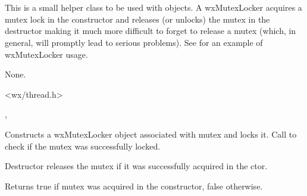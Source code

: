 \section{}\label{wxmutexlocker}

This is a small helper class to be used with  
objects. A wxMutexLocker acquires a mutex lock in the constructor and releases
(or unlocks) the mutex in the destructor making it much more difficult to
forget to release a mutex (which, in general, will promptly lead to serious
problems). See  for an example of wxMutexLocker
usage.


None.


<wx/thread.h>


, 


\label{wxmutexlockerctor}


Constructs a wxMutexLocker object associated with mutex and locks it.
Call  to check if the mutex was
successfully locked.

\label{wxmutexlockerdtor}


Destructor releases the mutex if it was successfully acquired in the ctor.

\label{wxmutexlockerisok}


Returns true if mutex was acquired in the constructor, false otherwise.

